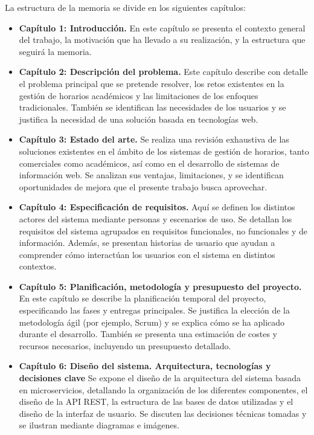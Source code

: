 La estructura de la memoria se divide en los siguientes capítulos:

\begin{itemize}
    \item \textbf{Capítulo 1: Introducción.} En este capítulo se presenta el contexto general del trabajo, la motivación que ha llevado a su realización, y la estructura que seguirá la memoria.
    
    \item \textbf{Capítulo 2: Descripción del problema.} Este capítulo describe con detalle el problema principal que se pretende resolver, los retos existentes en la gestión de horarios académicos y las limitaciones de los enfoques tradicionales. También se identifican las necesidades de los usuarios y se justifica la necesidad de una solución basada en tecnologías web.
    
    \item \textbf{Capítulo 3: Estado del arte.} Se realiza una revisión exhaustiva de las soluciones existentes en el ámbito de los sistemas de gestión de horarios, tanto comerciales como académicos, así como en el desarrollo de sistemas de información web. Se analizan sus ventajas, limitaciones, y se identifican oportunidades de mejora que el presente trabajo busca aprovechar.
    
    \item \textbf{Capítulo 4: Especificación de requisitos.} Aquí se definen los distintos actores del sistema mediante personas y escenarios de uso. Se detallan los requisitos del sistema agrupados en requisitos funcionales, no funcionales y de información. Además, se presentan historias de usuario que ayudan a comprender cómo interactúan los usuarios con el sistema en distintos contextos.
    
    \item \textbf{Capítulo 5: Planificación, metodología y presupuesto del proyecto.} En este capítulo se describe la planificación temporal del proyecto, especificando las fases y entregas principales. Se justifica la elección de la metodología ágil (por ejemplo, Scrum) y se explica cómo se ha aplicado durante el desarrollo. También se presenta una estimación de costes y recursos necesarios, incluyendo un presupuesto detallado.
    
    \item \textbf{Capítulo 6: Diseño del sistema. Arquitectura, tecnologías y decisiones clave} Se expone el diseño de la arquitectura del sistema basada en microservicios, detallando la organización de los diferentes componentes, el diseño de la API REST, la estructura de las bases de datos utilizadas y el diseño de la interfaz de usuario. Se discuten las decisiones técnicas tomadas y se ilustran mediante diagramas e imágenes.
    

\end{itemize}
